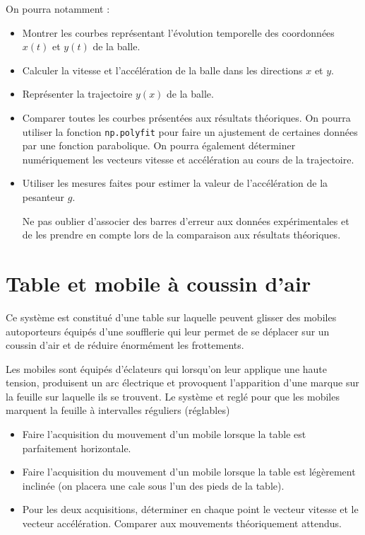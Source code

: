 \documentclass[a4paper]{tp}
\begin{document}
On pourra notamment :
\begin{itemize}
\item Montrer les courbes représentant l'évolution temporelle des coordonnées $x(t)$ et $y(t)$ de la balle.
\item Calculer la vitesse et l'accélération de la balle dans les directions $x$ et $y$.
\item Représenter la trajectoire $y(x)$ de la balle.
\item Comparer toutes les courbes présentées aux résultats théoriques. On pourra utiliser la fonction \texttt{np.polyfit} pour faire un ajustement de certaines données par une fonction parabolique. On pourra également déterminer numériquement les vecteurs vitesse et accélération au cours de la trajectoire.
\item Utiliser les mesures faites pour estimer la valeur de l'accélération de la pesanteur $g$.

Ne pas oublier d'associer des barres d'erreur aux données expérimentales et de les prendre en compte lors de la comparaison aux résultats théoriques.  
\end{itemize}  

\section{Table et mobile à coussin d'air}%
\label{sec:table_et_mobile_a_coussin_d_air}

Ce système est constitué d'une table sur laquelle peuvent glisser des mobiles autoporteurs équipés d'une soufflerie qui leur permet de se déplacer sur un coussin d'air et de réduire énormément les frottements.

Les mobiles sont équipés d'éclateurs qui lorsqu'on leur applique une haute tension, produisent un arc électrique et provoquent l'apparition d'une marque sur la feuille sur laquelle ils se trouvent. Le système et reglé pour que les mobiles marquent la feuille à intervalles réguliers (réglables)

\begin{itemize}
  \item Faire l'acquisition du mouvement d'un mobile lorsque la table est parfaitement horizontale.
  \item Faire l'acquisition du mouvement d'un mobile lorsque la table est légèrement inclinée (on placera une cale sous l'un des pieds de la table).
  \item Pour les deux acquisitions, déterminer en chaque point le vecteur vitesse et le vecteur accélération. Comparer aux mouvements théoriquement attendus.
\end{itemize}
\end{document}
